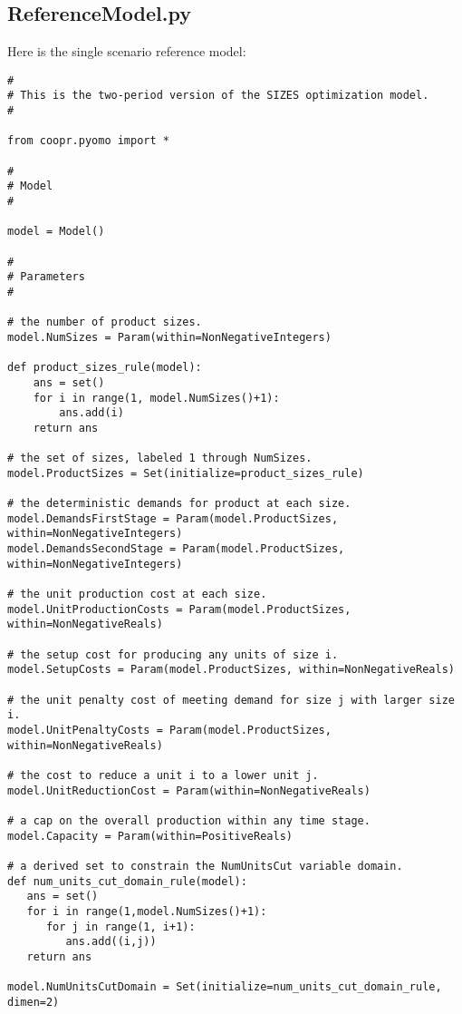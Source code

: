 \subsection{ReferenceModel.py}

Here is the single scenario reference model:

{\small
\begin{verbatim}
#
# This is the two-period version of the SIZES optimization model.
#

from coopr.pyomo import *

#
# Model
#

model = Model()

#
# Parameters
#

# the number of product sizes.
model.NumSizes = Param(within=NonNegativeIntegers)

def product_sizes_rule(model):
    ans = set()
    for i in range(1, model.NumSizes()+1):
        ans.add(i)
    return ans

# the set of sizes, labeled 1 through NumSizes.
model.ProductSizes = Set(initialize=product_sizes_rule)

# the deterministic demands for product at each size.
model.DemandsFirstStage = Param(model.ProductSizes, within=NonNegativeIntegers)
model.DemandsSecondStage = Param(model.ProductSizes, within=NonNegativeIntegers)

# the unit production cost at each size.
model.UnitProductionCosts = Param(model.ProductSizes, within=NonNegativeReals)

# the setup cost for producing any units of size i.
model.SetupCosts = Param(model.ProductSizes, within=NonNegativeReals)

# the unit penalty cost of meeting demand for size j with larger size i.
model.UnitPenaltyCosts = Param(model.ProductSizes, within=NonNegativeReals)

# the cost to reduce a unit i to a lower unit j.
model.UnitReductionCost = Param(within=NonNegativeReals)

# a cap on the overall production within any time stage.
model.Capacity = Param(within=PositiveReals)

# a derived set to constrain the NumUnitsCut variable domain.
def num_units_cut_domain_rule(model):
   ans = set()
   for i in range(1,model.NumSizes()+1):
      for j in range(1, i+1):
         ans.add((i,j))    
   return ans

model.NumUnitsCutDomain = Set(initialize=num_units_cut_domain_rule, dimen=2)


\end{verbatim}}
